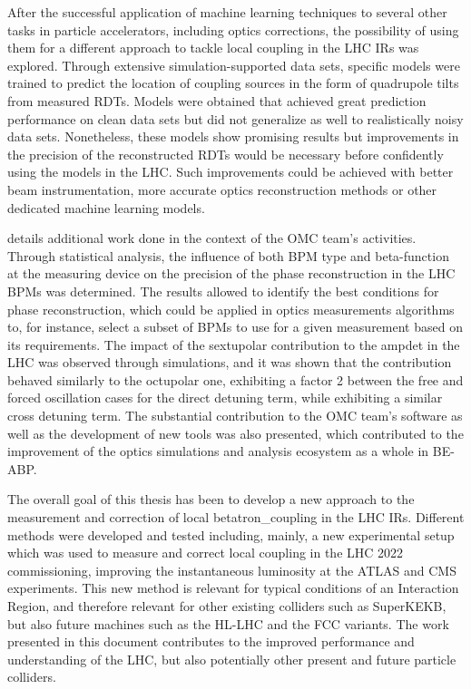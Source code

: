 After the successful application of machine learning techniques to several other tasks in particle accelerators, including optics corrections, the possibility of using them for a different approach to tackle local coupling in the \gls{LHC} \glspl{IR} was explored.
Through extensive simulation-supported data sets, specific models were trained to predict the location of coupling sources in the form of quadrupole tilts from measured \glspl{RDT}.
Models were obtained that achieved great prediction performance on clean data sets but did not generalize as well to realistically noisy data sets.
Nonetheless, these models show promising results but improvements in the precision of the reconstructed \glspl{RDT} would be necessary before confidently using the models in the \gls{LHC}.
Such improvements could be achieved with better beam instrumentation, more accurate optics reconstruction methods or other dedicated machine learning models.
\break

 details additional work done in the context of the \gls{OMC} team's activities.
Through statistical analysis, the influence of both \gls{BPM} type and \gls{beta-function} at the measuring device on the precision of the phase reconstruction in the \gls{LHC} \glspl{BPM} was determined.
The results allowed to identify the best conditions for phase reconstruction, which could be applied in optics measurements algorithms to, for instance, select a subset of \glspl{BPM} to use for a given measurement based on its requirements.
The impact of the sextupolar contribution to the \gls{ampdet} in the \gls{LHC} was observed through simulations, and it was shown that the contribution behaved similarly to the octupolar one, exhibiting a factor \num{2} between the free and forced oscillation cases for the direct detuning term, while exhibiting a similar cross detuning term.
The substantial contribution to the \gls{OMC} team's software as well as the development of new tools was also presented, which contributed to the improvement of the optics simulations and analysis ecosystem as a whole in \acrshort{BE}-\acrshort{ABP}.
\break
{}

The overall goal of this thesis has been to develop a new approach to the measurement and correction of local \gls{betatron_coupling} in the \gls{LHC} \glspl{IR}.
Different methods were developed and tested including, mainly, a new experimental setup which was used to measure and correct local coupling in the \gls{LHC} \num{2022} commissioning, improving the instantaneous luminosity at the \acrshort{ATLAS} and \acrshort{CMS} \glspl{experiment}.
This new method is relevant for typical conditions of an Interaction Region, and therefore relevant for other existing colliders such as SuperKEKB, but also future machines such as the \gls{HL-LHC} and the \gls{FCC} variants.
The work presented in this document contributes to the improved performance and understanding of the \gls{LHC}, but also potentially other present and future particle colliders.


\glsresetall                                     %

